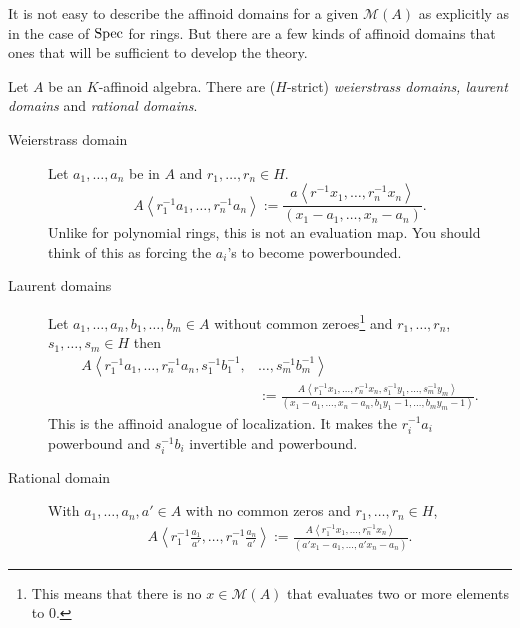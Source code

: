 It is not easy to describe the affinoid domains for a given $\mathcal{M} (A)$ as explicitly as in the case of $\operatorname{Spec}$ for rings. 
But there are a few kinds of affinoid domains that ones that will be sufficient to develop the theory. 
\begin{definition}
	Let $A$ be an $K$-affinoid algebra. 
	There are ($H$-strict) \emph{weierstrass domains, laurent domains} and \emph{rational domains}. 
	\begin{description}
		\item[Weierstrass domain] Let $a_1, \ldots, a_n$ be in $A$ and $r_1, \ldots, r_n \in H$. 
			\[
				A\left<r_1^{-1}a_1, \ldots, r_n^{-1}a_n \right> := \frac{a\left<r^{-1}x_1, \ldots, r^{-1}_nx_n \right>}{(x_1-a_1, \ldots, x_n - a_n)}
			.\] 
			Unlike for polynomial rings, this is not an evaluation map. You should think of this as forcing the $a_i$'s to become powerbounded. 
		\item [Laurent domains]
			Let $a_1, \ldots, a_n, b_1, \ldots, b_m \in A$ without common zeroes\footnote{This means that there is no $x \in \mathcal{M} (A)$ that evaluates two or more elements to $0$.} and $r_1,\ldots, r_n$, $s_1, \ldots, s_m \in H$ then 
			\begin{align*}
				A\left<r_1^{-1}a_1, \ldots, r_n^{-1}a_n, s^{-1}_1b_1^{-1}, \right. & \left. \ldots, s^{-1}_mb_m^{-1} \right> \\
				&:= \frac{A\left<r^{-1}_1x_1, \ldots, r^{-1}_nx_n,s^{-1}_1y_1, \ldots,s_m^{-1} y_m  \right>}{(x_1 - a_1, \ldots, x_n - a_n, b_1 y_1 - 1, \ldots, b_m y_m - 1)}
			.\end{align*} 
			This is the affinoid analogue of localization. It makes the $r_i^{-1}a_i$ powerbound and $s_i^{-1}b_i$ invertible and powerbound. 
		\item[Rational domain] With $a_1, \ldots, a_n, a' \in A$ with no common zeros and $r_1, \ldots, r_n \in H$,
			\begin{align*}
				A \left<r_1^{-1}\frac{a_1}{a'}, \ldots, r_n^{-1}\frac{a_n}{a'} \right> := \frac{A\left<r_1^{-1}x_1, \ldots, r_n^{-1}x_n \right>}{(a' x_1 - a_1, \ldots, a' x_n - a_n)}
			.\end{align*}
	\end{description}
\end{definition}

